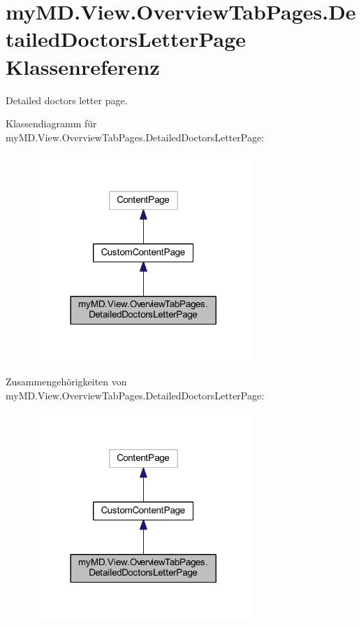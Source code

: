 \hypertarget{classmy_m_d_1_1_view_1_1_overview_tab_pages_1_1_detailed_doctors_letter_page}{}\section{my\+M\+D.\+View.\+Overview\+Tab\+Pages.\+Detailed\+Doctors\+Letter\+Page Klassenreferenz}
\label{classmy_m_d_1_1_view_1_1_overview_tab_pages_1_1_detailed_doctors_letter_page}


Detailed doctors letter page.  




Klassendiagramm für my\+M\+D.\+View.\+Overview\+Tab\+Pages.\+Detailed\+Doctors\+Letter\+Page\+:\nopagebreak
\begin{figure}[H]
\begin{center}
\leavevmode
\includegraphics[width=236pt]{classmy_m_d_1_1_view_1_1_overview_tab_pages_1_1_detailed_doctors_letter_page__inherit__graph}
\end{center}
\end{figure}


Zusammengehörigkeiten von my\+M\+D.\+View.\+Overview\+Tab\+Pages.\+Detailed\+Doctors\+Letter\+Page\+:\nopagebreak
\begin{figure}[H]
\begin{center}
\leavevmode
\includegraphics[width=236pt]{classmy_m_d_1_1_view_1_1_overview_tab_pages_1_1_detailed_doctors_letter_page__coll__graph}
\end{center}
\end{figure}
